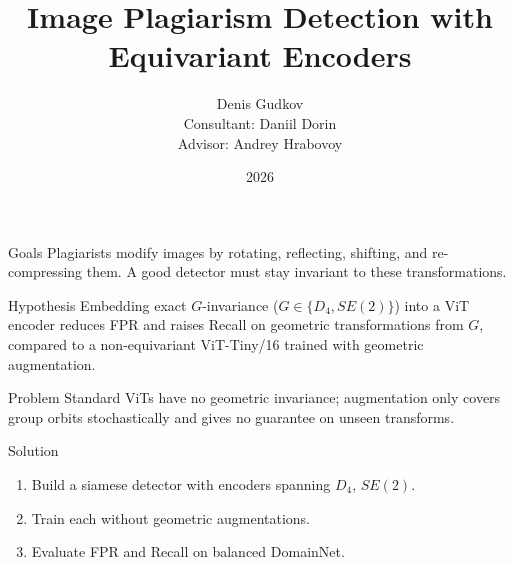 \documentclass[aspectratio=169]{beamer}
\title{Image Plagiarism Detection with Equivariant Encoders}
\author{
    Denis Gudkov\\
    Consultant: Daniil Dorin\\
    Advisor: Andrey Hrabovoy
}
\institute{
    Course: My first scientific paper\\
    Intelligent Systems Department, MIPT
}
\date{2026}
\begin{document}
\begin{frame}
    \thispagestyle{empty}
    \maketitle
\end{frame}

\begin{frame}{Goals}
    Plagiarists modify images by rotating, reflecting, shifting, and re-compressing them.
    A good detector must stay invariant to these transformations.
    \begin{block}{Hypothesis}
        Embedding exact $G$-invariance ($G \in \{D_4, SE(2)\}$) into a ViT encoder reduces FPR and raises Recall on geometric transformations from $G$, compared to a non-equivariant ViT-Tiny/16 trained with geometric augmentation.
    \end{block}
    \begin{block}{Problem}
        Standard ViTs have no geometric invariance; augmentation only covers group orbits stochastically and gives no guarantee on unseen transforms.
    \end{block}
    \begin{block}{Solution}
        \begin{enumerate}[1)]
            \item Build a siamese detector with encoders spanning $D_4$, $SE(2)$.
            \item Train each without geometric augmentations.
            \item Evaluate FPR and Recall on balanced DomainNet.
        \end{enumerate}
    \end{block}
\end{frame}
\end{document}
